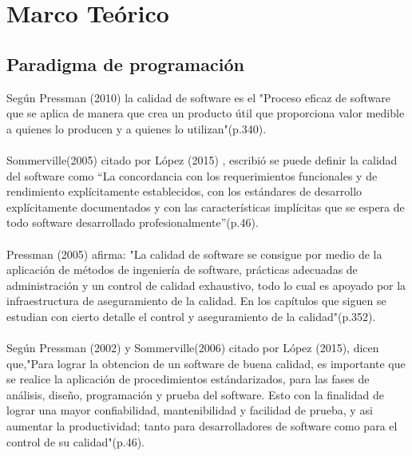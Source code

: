 \documentclass[preprint,12pt]{elsarticle}
\begin{document}
\section{Marco Teórico}
	\subsection{\textbf{Paradigma de programación}}
Según Pressman (2010) la calidad de software es el "Proceso eficaz de software que se aplica de manera que crea un producto útil que proporciona valor medible a quienes lo producen y a quienes lo utilizan"(p.340).\cite{referenciatorres1}
\\
\\
Sommerville(2005) citado por López (2015) , escribió se puede definir la calidad del software como “La concordancia con los requerimientos funcionales y de rendimiento explícitamente establecidos, con los estándares de desarrollo explícitamente documentados y con las características implícitas que se espera de todo software desarrollado profesionalmente”(p.46).\cite{referenciatorres2}
\\
\\
Pressman (2005) afirma: "La calidad de software se consigue por medio de la aplicación de métodos de ingeniería de software, prácticas adecuadas de administración y un control de calidad exhaustivo, todo lo cual es apoyado por la infraestructura de aseguramiento de la calidad. En los capítulos que siguen se estudian con cierto detalle el control y aseguramiento de la calidad"(p.352).\cite{referenciatorres1}
\\
\\
Según Pressman (2002) y Sommerville(2006) citado por López (2015), dicen que,"Para lograr la obtencion de un software de buena calidad, es importante que se realice la aplicación de procedimientos estándarizados, para las fases de análisis, diseño, programación y prueba del software. Esto con la finalidad de lograr una mayor confiabilidad, mantenibilidad y facilidad de prueba, y asi aumentar la productividad; tanto para desarrolladores de software como para el control de su calidad"(p.46).\cite{referenciatorres2}
\\


\end{document}
